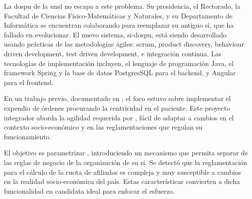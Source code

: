 

La \acrfull{dospu} de la \acrfull{unsl} no escapa a este problema. 
Su presidencia, el Rectorado, la Facultad de Ciencias Físico-Matemáticas y Naturales, y su Departamento de Informática se encuentran colaborando para reemplazar su antiguo \acrshort{si}, que ha fallado en evolucionar. 
%
El nuevo sistema, \acrshort{si}-\acrshort{dospu}, está siendo desarrollado usando prácticas de las metodologías ágiles: scrum, product discovery, behaviour driven development, test driven development, e integración continua.
%
Las tecnologías de implementación incluyen, el lenguaje de programación Java, el framework Spring y la base de datos PostgresSQL para el backend, y Angular para el frontend. 

En un trabajo previo, documentado en \cite{Vela2024}, el foco estuvo sobre implementar el expendio de órdenes procurando la centricidad en el paciente.
%
Este proyecto integrador aborda la agilidad requerida por {\SIOSU}, fácil de adaptar a cambios en el contexto socio-económico y en las reglamentaciones que regulan su funcionamiento.



El objetivo es parametrizar {\SIDOSPU}, introduciendo un mecanismo que permita separar de las reglas de negocio de la organización de su \acrshort{si}. 
Se detectó que la reglamentación para el cálculo de la cuota de afiliados es compleja y muy susceptible a cambios en la realidad socio-económica del país. 
Estas características convierten a dicha funcionalidad en candidata ideal para enfocar el esfuerzo.


